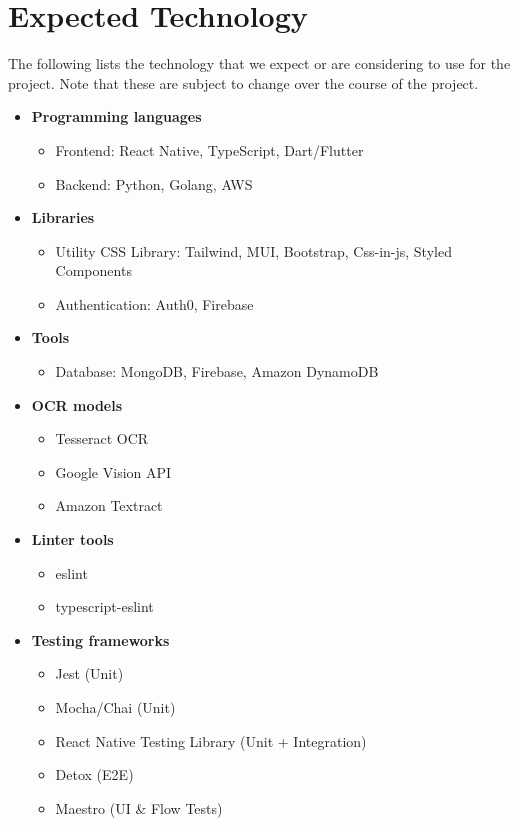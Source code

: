 \documentclass{article}
\begin{document}
\newpage

\section{Expected Technology}

The following lists the technology that we expect or are considering to use for the project. Note that these are subject to change over the course of the project.

\begin{itemize}
    \item \textbf{Programming languages}
    \begin{itemize}
        \item Frontend: React Native, TypeScript, Dart/Flutter
        \item Backend: Python, Golang, AWS
    \end{itemize}
    
    \item \textbf{Libraries}
    \begin{itemize}
        \item Utility CSS Library: Tailwind, MUI, Bootstrap, Css-in-js, Styled Components
        \item Authentication: Auth0, Firebase
    \end{itemize}
    
    \item \textbf{Tools}
    \begin{itemize}
        \item Database: MongoDB, Firebase, Amazon DynamoDB
    \end{itemize}
    
    \item \textbf{OCR models}
    \begin{itemize}
        \item Tesseract OCR
        \item Google Vision API
        \item Amazon Textract
    \end{itemize}
    
    \item \textbf{Linter tools}
    \begin{itemize}
        \item eslint
        \item typescript-eslint
    \end{itemize}
    
    \item \textbf{Testing frameworks}
    \begin{itemize}
        \item Jest (Unit)
        \item Mocha/Chai (Unit)
        \item React Native Testing Library (Unit + Integration)
        \item Detox (E2E)
        \item Maestro (UI \& Flow Tests)
    \end{itemize}
    

\end{itemize}
\end{document}
